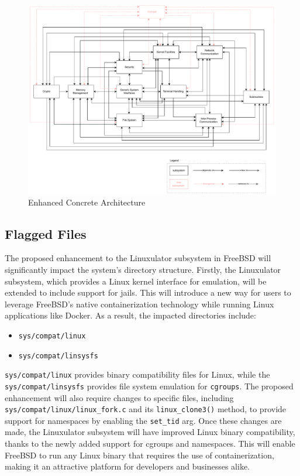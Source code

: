 \documentclass[12pt, dvipsnames, a4paper]{article}
\newcommand{\code}[1]{\texttt{#1}}
\begin{document}
\begin{figure}[!htb]
	\center
	\includegraphics[width = 500pt]{assets/architecture_diagrams/enhanced-concrete-architecture.pdf}
	\caption{Enhanced Concrete Architecture}
\end{figure}

\subsection{Flagged Files}

The proposed enhancement to the Linuxulator subsystem in FreeBSD will significantly impact the system's directory structure. Firstly, the Linuxulator subsystem, which provides a Linux kernel interface for emulation, will be extended to include support for jails. This will introduce a new way for users to leverage FreeBSD's native containerization technology while running Linux applications like Docker.
As a result, the impacted directories include:
\begin{itemize}
	\item \code{sys/compat/linux}
	\item \code{sys/compat/linsysfs}
\end{itemize}

\code{sys/compat/linux} provides binary compatibility files for Linux, while the \code{sys/compat/linsysfs} provides file system emulation for \code{cgroups}. The proposed enhancement will also require changes to specific files, including \code{sys/compat/linux/linux\_fork.c} and its \code{linux\_clone3()} method, to provide support for namespaces by enabling the \code{set\_tid} arg.
Once these changes are made, the Linuxulator subsystem will have improved Linux binary compatibility, thanks to the newly added support for cgroups and namespaces. This will enable FreeBSD to run any Linux binary that requires the use of containerization, making it an attractive platform for developers and businesses alike.
\end{document}
